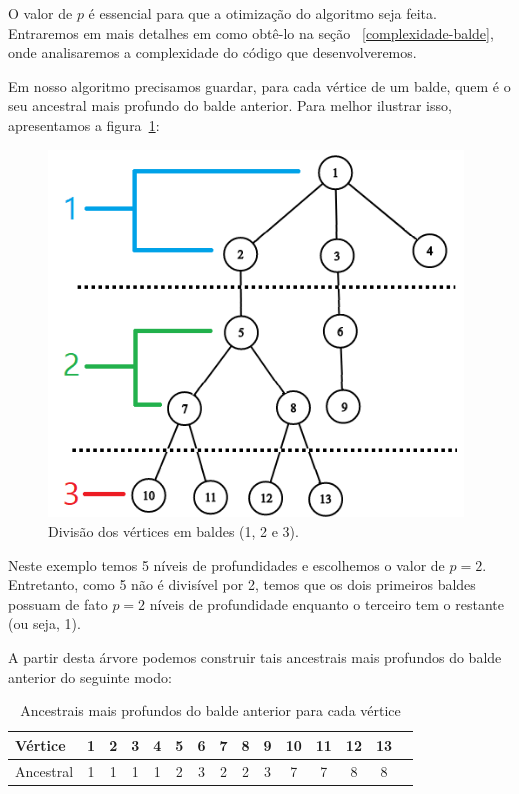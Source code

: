 O valor de $p$ é essencial para que a otimização do algoritmo seja feita. Entraremos em mais detalhes em como obtê-lo na seção ~\ref{complexidade-balde}, onde analisaremos a complexidade do código que desenvolveremos.

Em nosso algoritmo precisamos guardar, para cada vértice de um balde, quem é o seu ancestral mais profundo do balde anterior. Para melhor ilustrar isso, apresentamos a figura~\ref{fig:arvore-baldes}:

\begin{figure}[htb]
\begin{center}
\includegraphics[width=11cm]{images/tree_buckets.png}
\end{center}
\caption{\label{fig:arvore-baldes}Divisão dos vértices em baldes (1, 2 e 3).}
\end{figure}

Neste exemplo temos 5 níveis de profundidades e escolhemos o valor de $p = 2$. Entretanto, como 5 não é divisível por 2, temos que os dois primeiros baldes possuam de fato $p = 2$ níveis de profundidade enquanto o terceiro tem o restante (ou seja, 1).

A partir desta árvore podemos construir tais ancestrais mais profundos do balde anterior do seguinte modo:

\begin{table}[htb]
\centering
\begin{tabular}{|l|c|c|c|c|c|c|c|c|c|c|c|c|c|c|}
\hline
Vértice   & 1 & 2 & 3 & 4 & 5 & 6 & 7 & 8 & 9 & 10 & 11 & 12 & 13 \\ \hline
Ancestral & 1 & 1 & 1 & 1 & 2 & 3 & 2 & 2 & 3 & 7  & 7  & 8  & 8 \\ \hline
\end{tabular}
\caption{Ancestrais mais profundos do balde anterior para cada vértice}
\end{table}

